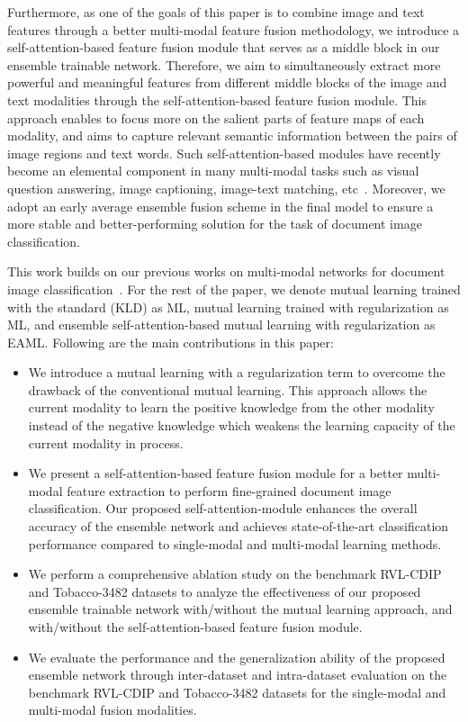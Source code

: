 \documentclass[twocolumn]{svjour3}
\begin{document}
Furthermore, as one of the goals of this paper is to combine image and text features through a better multi-modal feature fusion methodology, we introduce a self-attention-based feature fusion module that serves as a middle block in our ensemble trainable network. 
Therefore, we aim to simultaneously extract more powerful and meaningful features from different middle blocks of the image and text modalities through the self-attention-based feature fusion module. This approach enables to focus more on the salient parts of feature maps of each modality, and aims to capture relevant semantic information between the pairs of image regions and text words. 
Such self-attention-based modules have recently become an elemental component in many multi-modal tasks such as visual question answering, image captioning, image-text matching, etc~\cite{NEURIPS2018_96ea64f3, Nguyen2018ImprovedFO, Yan2020ImageCV, Lee2018StackedCA}. Moreover, we adopt an early average ensemble fusion scheme in the final model to ensure a more stable and better-performing solution for the task of document image classification.

This work builds on our previous works on multi-modal networks for document image classification~\cite{souhailbakkali, 9191268}. For the rest of the paper, we denote mutual learning trained with the standard (KLD) as ML, mutual learning trained with regularization as ML, and ensemble self-attention-based mutual learning with regularization as EAML.
Following are the main contributions in this paper:

\begin{itemize}
    \item We introduce a mutual learning with a regularization term to overcome the drawback of the conventional mutual learning. This approach allows the current modality to learn the positive knowledge from the other modality instead of the negative knowledge which weakens the learning capacity of the current modality in process.
    
    \item We present a self-attention-based feature fusion module for a better multi-modal feature extraction to perform fine-grained document image classification. Our proposed self-attention-module enhances the overall accuracy of the ensemble network and achieves state-of-the-art classification performance compared to single-modal and multi-modal learning methods. 
    
    \item We perform a comprehensive ablation study on the benchmark RVL-CDIP and Tobacco-3482 datasets to analyze the effectiveness of our proposed ensemble trainable network with/without the mutual learning approach, and with/without the self-attention-based feature fusion module.
    
    \item We evaluate the performance and the generalization ability of the proposed ensemble network through inter-dataset and intra-dataset evaluation on the benchmark RVL-CDIP and Tobacco-3482 datasets for the single-modal and multi-modal fusion modalities.
\end{itemize}
\end{document}

